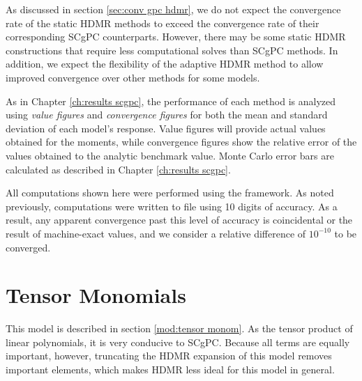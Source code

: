 As discussed in section \ref{sec:conv gpc hdmr}, we do not expect the convergence rate of the static HDMR
methods to exceed the convergence rate of their corresponding SCgPC counterparts.  However, there may be some
static HDMR constructions that require less computational solves than SCgPC methods.  In addition, we expect
the flexibility of the adaptive HDMR method to allow improved convergence over other methods for some models.

As in Chapter \ref{ch:results scgpc}, the performance of each method is analyzed using \emph{value figures}
and \emph{convergence figures} for both the mean and standard deviation of each model's response.  Value
figures will provide actual values obtained for the moments, while convergence figures show the relative error
of the values obtained to the analytic benchmark value.  Monte Carlo error bars are calculated as described in
Chapter \ref{ch:results scgpc}.

All computations shown here were performed using the \raven{} \cite{raven} framework.  As noted previously,
computations were written to file using 10 digits of accuracy.
As a result, any apparent convergence past this level of accuracy is coincidental or the result of
machine-exact values, and we consider a relative difference of $10^{-10}$ to be converged.

\section{Tensor Monomials}
This model is described in section \ref{mod:tensor monom}.  As the tensor product of linear polynomials, it is
very conducive to SCgPC.  Because all terms are equally important, however, truncating the HDMR expansion of
this model removes important elements, which makes HDMR less ideal for this model in general.

